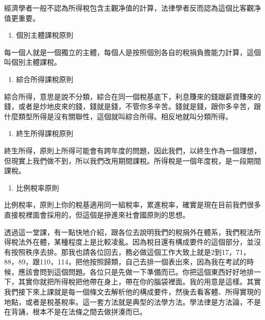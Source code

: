 \documentclass[]{ctexbook}
\providecommand{\tightlist}{%
  \setlength{\itemsep}{0pt}\setlength{\parskip}{0pt}}
\begin{document}
經濟學者一般不認為所得稅包含主觀净值的計算，法律學者反而認為這個比客觀净值更重要。

\begin{enumerate}
\def\labelenumi{\arabic{enumi}.}
\setcounter{enumi}{6}
\tightlist
\item
  個別主體課稅原則
\end{enumerate}

每一個人就是一個獨立的主體，每個人是按照個別各自的稅捐負擔能力計算，這個叫個別主體課稅。

\begin{enumerate}
\def\labelenumi{\arabic{enumi}.}
\setcounter{enumi}{7}
\tightlist
\item
  綜合所得課稅原則
\end{enumerate}

綜合所得，意思是說不分類，綜合在同一個稅基底下，利息賺來的錢跟薪資賺來的錢，或者是炒地皮來的錢，錢就是錢，不管你多辛苦。錢就是錢，跟你多辛苦，跟什麼類型所得是沒有關聯性，這個就叫綜合所得。相反地就叫分類所得。

\begin{enumerate}
\def\labelenumi{\arabic{enumi}.}
\setcounter{enumi}{8}
\tightlist
\item
  終生所得課稅原則
\end{enumerate}

終生所得，原則上所得可能會有跨年度的問題，因此我們，以終生作為一個理想，但現實上我們做不到，所以我們改用期間課稅。所得稅是一個年度稅，是一段期間課稅。

\begin{enumerate}
\def\labelenumi{\arabic{enumi}.}
\setcounter{enumi}{9}
\tightlist
\item
  比例稅率原則
\end{enumerate}

比例稅率，原則上你的稅基適用同一組稅率，累進稅率，確實是現在目前我們很多直接稅裡面會採用的，但這個是摻進來社會國原則的思想。

透過這一堂課，有一點快地介紹，跟各位去說明我們的稅捐外在體系，我們稅法所得稅法外在體，某種程度上是比較凌亂。因為稅目還有構成要件的這個部分，並沒有按照秩序去排。那我也請各位回去，務必做這個工作大致上就是2到17，71，88，89，跟110，114，把他按照歸類，自己去排一個表出來，因為我在考試的時候，應該會問到這個問題。各位只是先做一下準備而已。你把這個東西好好地排一下，其實你就把所得稅把他帶在身上，帶在你的腦袋裡面。我的用意是這樣。其實我們接下來上課就是每一個條文去解析他的構成要件，然後去看客體、所得實現的地點，或者是稅基稅率。這一套方法就是典型的法學方法。學法律是方法論，不是在背誦，根本不是在法條之間去做拼湊而已。
\end{document}
